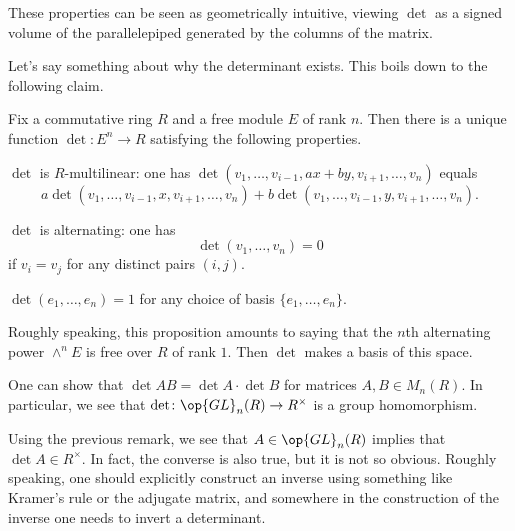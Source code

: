 \documentclass[../notes.tex]{subfiles}
\begin{document}
\begin{remark}
	These properties can be seen as geometrically intuitive, viewing $\det$ as a signed volume of the parallelepiped generated by the columns of the matrix.
\end{remark}
Let's say something about why the determinant exists. This boils down to the following claim.
\begin{proposition}
	Fix a commutative ring $R$ and a free module $E$ of rank $n$. Then there is a unique function $\det\colon E^n\to R$ satisfying the following properties.
	\begin{listalph}
		\item $\det$ is $R$-multilinear: one has $\det(v_1,\ldots,v_{i-1},ax+by,v_{i+1},\ldots,v_n)$ equals
		\[a\det(v_1,\ldots,v_{i-1},x,v_{i+1},\ldots,v_n)+b\det(v_1,\ldots,v_{i-1},y,v_{i+1},\ldots,v_n).\]
		\item $\det$ is alternating: one has
		\[\det(v_1,\ldots,v_n)=0\]
		if $v_i=v_j$ for any distinct pairs $(i,j)$.
		\item $\det(e_1,\ldots,e_n)=1$ for any choice of basis $\{e_1,\ldots,e_n\}$.
	\end{listalph}
\end{proposition}
\begin{remark}
	Roughly speaking, this proposition amounts to saying that the $n$th alternating power $\land^nE$ is free over $R$ of rank $1$. Then $\det$ makes a basis of this space.
\end{remark}
\begin{remark}
	One can show that $\det AB=\det A\cdot\det B$ for matrices $A,B\in M_n(R)$. In particular, we see that $\det\colon\op{GL}_n(R)\to R^\times$ is a group homomorphism.
\end{remark}
\begin{remark}
	Using the previous remark, we see that $A\in\op{GL}_n(R)$ implies that $\det A\in R^\times$. In fact, the converse is also true, but it is not so obvious. Roughly speaking, one should explicitly construct an inverse using something like Kramer's rule or the adjugate matrix, and somewhere in the construction of the inverse one needs to invert a determinant.
\end{remark}
\end{document}
